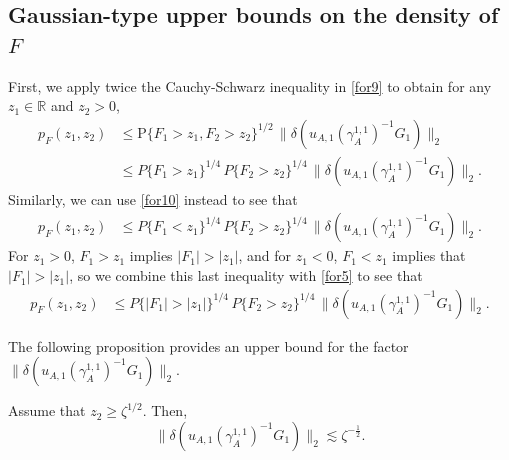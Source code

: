 \documentclass[12pt,a4paper]{article}
\newcommand{\R}{{\mathbb{R}}}
\renewcommand{\P}{\mathrm{P}}
\newcommand {\deltah}{{\zeta}}
\newcommand{\<}{\langle}
\renewcommand{\>}{\rangle}
\begin{document}
    
  \subsection{Gaussian-type upper bounds on the density of $F$}
  
  First, %
 we apply twice the Cauchy-Schwarz inequality in \eqref{for9} to obtain for any $z_1\in \R$ and $z_2 > 0$,
\begin{align} \nonumber
   p_F(z_1,z_2) &\le      \P\{F_1 > z_1,  F_2>z_2\}^{1/2} \, \| \delta( u_{A,1} (\gamma_A^{1,1})^{-1}     G_1)\|_2 \\
      &\leq P\{F_1 > z_1 \}^{1/4}\, P\{F_2>z_2 \}^{1/4}\,  \| \delta( u_{A,1} (\gamma_A^{1,1})^{-1}     G_1)\|_2.  
 \label{for5}
 \end{align}
 Similarly, we can use \eqref{for10} instead to see that
 \begin{align*}
    p_F(z_1,z_2) &\le P\{F_1 < z_1 \}^{1/4}\, P\{F_2>z_2 \}^{1/4}\,  \| \delta( u_{A,1} (\gamma_A^{1,1})^{-1}     G_1)\|_2. 
  \end{align*}
 For $z_1 > 0$, $F_1 > z_1$ implies $\vert F_1\vert > \vert z_1\vert$, and for $z_1 < 0$,  $F_1 < z_1$ implies that $\vert F_1\vert > \vert z_1\vert$, so we combine this last inequality with \eqref{for5} to see that
  \begin{align}\label{rd08_08e1}
    p_F(z_1,z_2) &\le P\{\vert F_1\vert > \vert z_1\vert \}^{1/4}\, P\{F_2>z_2 \}^{1/4}\,  \| \delta( u_{A,1} (\gamma_A^{1,1})^{-1}     G_1)\|_2. 
  \end{align}
  
  
The following proposition provides an upper bound for the factor $\|\delta( u_{A,1}
  (\gamma_A^{1,1})^{-1}     G_1)\|_2$.

\begin{proposition} \label{prop1}
Assume that $z_2 \ge \deltah^{1/2}$. Then,
\begin{equation}
\label{equ1}
\|  \delta( u_{A,1} (\gamma_A^{1,1})^{-1}    G_1)\|_2 \lesssim \deltah^{-\frac 12}.
\end{equation}
\end{proposition}
\end{document}
